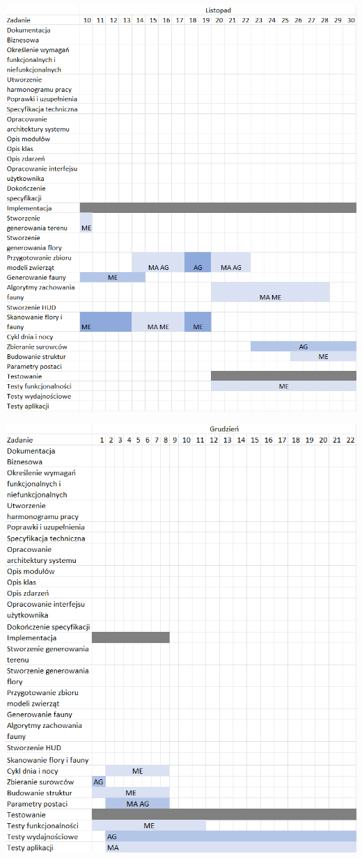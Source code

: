 \begin{center}
    \includegraphics[width=\textwidth]{Graphics/h2.png}
\end{center}

\begin{center}
    \includegraphics[width=\textwidth]{Graphics/h3.png}
\end{center}